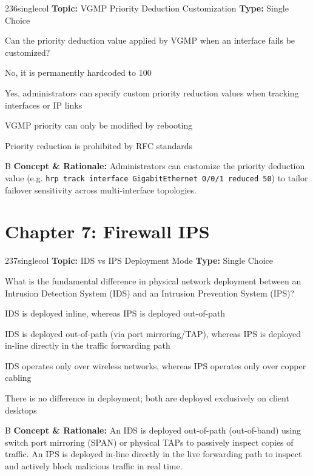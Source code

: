\begin{qcard}{236}{singlecol}
\textcolor{darkslate!75}{\small\textbf{Topic:} VGMP Priority Deduction Customization \hfill \textbf{Type:} Single Choice}\vspace{0.4em}\par
Can the priority deduction value applied by VGMP when an interface fails be customized?
\begin{qoptions}
\item No, it is permanently hardcoded to 100
\item Yes, administrators can specify custom priority reduction values when tracking interfaces or IP links
\item VGMP priority can only be modified by rebooting
\item Priority reduction is prohibited by RFC standards
\end{qoptions}
\end{qcard}
\nopagebreak
\begin{explainbox}{B}
\textbf{Concept \& Rationale:} Administrators can customize the priority deduction value (e.g. \texttt{hrp track interface GigabitEthernet 0/0/1 reduced 50}) to tailor failover sensitivity across multi-interface topologies.
\end{explainbox}

\section{Chapter 7: Firewall IPS}

\begin{qcard}{237}{singlecol}
\textcolor{darkslate!75}{\small\textbf{Topic:} IDS vs IPS Deployment Mode \hfill \textbf{Type:} Single Choice}\vspace{0.4em}\par
What is the fundamental difference in physical network deployment between an Intrusion Detection System (IDS) and an Intrusion Prevention System (IPS)?
\begin{qoptions}
\item IDS is deployed inline, whereas IPS is deployed out-of-path
\item IDS is deployed out-of-path (via port mirroring/TAP), whereas IPS is deployed in-line directly in the traffic forwarding path
\item IDS operates only over wireless networks, whereas IPS operates only over copper cabling
\item There is no difference in deployment; both are deployed exclusively on client desktops
\end{qoptions}
\end{qcard}
\nopagebreak
\begin{explainbox}{B}
\textbf{Concept \& Rationale:} An IDS is deployed out-of-path (out-of-band) using switch port mirroring (SPAN) or physical TAPs to passively inspect copies of traffic. An IPS is deployed in-line directly in the live forwarding path to inspect and actively block malicious traffic in real time.
\end{explainbox}

